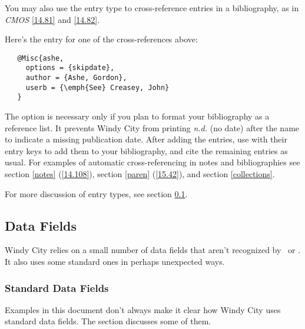 \documentclass[11pt,letterpaper,oneside]{article}
\begin{document}
You may also use the  entry type to cross-reference
entries in a bibliography, as in \textit{CMOS} \ref{14.81} and
\ref{14.82}.

\begin{bibonly}
\nocite{ashe,creasey1976,creasey1978,creasey1966,morton,york}
\end{bibonly}

\noindent Here's the  entry for one of the
cross-references above:

\begin{verbatim}
   @Misc{ashe,
     options = {skipdate},
     author = {Ashe, Gordon},
     userb = {\emph{See} Creasey, John}
   }
\end{verbatim}

\noindent The option  is necessary only if you plan to
format your bibliography as a reference list. It prevents Windy City
from printing \textit{n.d.} (no date) after the name to indicate a
missing publication date. After adding the  entries, use
 with their entry keys to add them to your bibliography,
and cite the remaining entries as usual. For examples of automatic
cross-referencing in notes and bibliographies see section \ref{notes}
(\ref{14.108}), section \ref{paren} (\ref{15.42}), and section
\ref{collections}.

For more discussion of entry types, see section \ref{datafields}.

\subsection{Data Fields}
\label{datafields}

Windy City relies on a small number of data fields that aren't
recognized by \BibTeX\ or \biblatex. It also uses some standard ones
in perhaps unexpected ways.

\subsubsection{Standard Data Fields}
\label{stdfields}

Examples in this document don't always make it clear how Windy City
uses standard data fields. The section discusses some of them.
\end{document}
